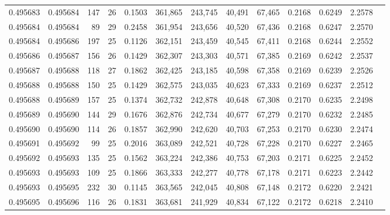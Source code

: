 \begin{tabular}{rrrrrrrrrrrrr}
0.495683 & 0.495684 & 147 &  26 &                                     0.1503 & 361,865 & 243,745 &  40,491 &  67,465 & 0.2168 & 0.6249 & 2.2578 \\
0.495684 & 0.495684 &  89 &  29 &                                     0.2458 & 361,954 & 243,656 &  40,520 &  67,436 & 0.2168 & 0.6247 & 2.2570 \\
0.495684 & 0.495686 & 197 &  25 &                                     0.1126 & 362,151 & 243,459 &  40,545 &  67,411 & 0.2168 & 0.6244 & 2.2552 \\
0.495686 & 0.495687 & 156 &  26 &                                     0.1429 & 362,307 & 243,303 &  40,571 &  67,385 & 0.2169 & 0.6242 & 2.2537 \\
0.495687 & 0.495688 & 118 &  27 &                                     0.1862 & 362,425 & 243,185 &  40,598 &  67,358 & 0.2169 & 0.6239 & 2.2526 \\
0.495688 & 0.495688 & 150 &  25 &                                     0.1429 & 362,575 & 243,035 &  40,623 &  67,333 & 0.2169 & 0.6237 & 2.2512 \\
0.495688 & 0.495689 & 157 &  25 &                                     0.1374 & 362,732 & 242,878 &  40,648 &  67,308 & 0.2170 & 0.6235 & 2.2498 \\
0.495689 & 0.495690 & 144 &  29 &                                     0.1676 & 362,876 & 242,734 &  40,677 &  67,279 & 0.2170 & 0.6232 & 2.2485 \\
0.495690 & 0.495690 & 114 &  26 &                                     0.1857 & 362,990 & 242,620 &  40,703 &  67,253 & 0.2170 & 0.6230 & 2.2474 \\
0.495691 & 0.495692 &  99 &  25 &                                     0.2016 & 363,089 & 242,521 &  40,728 &  67,228 & 0.2170 & 0.6227 & 2.2465 \\
0.495692 & 0.495693 & 135 &  25 &                                     0.1562 & 363,224 & 242,386 &  40,753 &  67,203 & 0.2171 & 0.6225 & 2.2452 \\
0.495693 & 0.495693 & 109 &  25 &                                     0.1866 & 363,333 & 242,277 &  40,778 &  67,178 & 0.2171 & 0.6223 & 2.2442 \\
0.495693 & 0.495695 & 232 &  30 &                                     0.1145 & 363,565 & 242,045 &  40,808 &  67,148 & 0.2172 & 0.6220 & 2.2421 \\
0.495695 & 0.495696 & 116 &  26 &                                     0.1831 & 363,681 & 241,929 &  40,834 &  67,122 & 0.2172 & 0.6218 & 2.2410 \\

\end{tabular}
